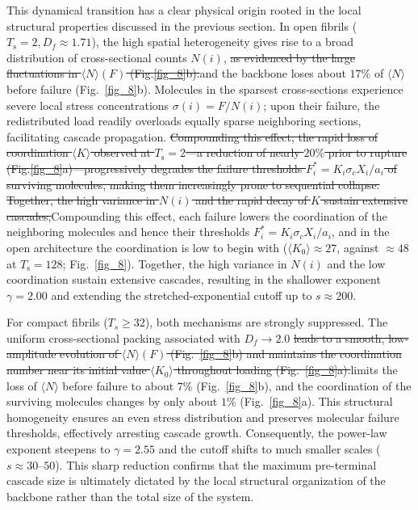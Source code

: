 \documentclass[aps,physrev,preprint,groupedaddress,linenumbers]{revtex4-2}
\newcommand{\added}[1]{{\color{red}#1}}
\newcommand{\deleted}[1]{{\color{red}\sout{#1}}}
\begin{document}
This dynamical transition has a clear physical origin rooted in the local structural properties discussed in the previous section. In open fibrils ($T_{\mathrm{s}} = 2, D_f \approx 1.71$), the high spatial heterogeneity gives rise to a broad distribution of cross-sectional counts $N(i)$, \deleted{as evidenced by the large fluctuations in $\langle N \rangle(F)$ (Fig.\ref{fig_8}b).}\added{and the backbone loses about $17\%$ of $\langle N \rangle$ before failure (Fig.~\ref{fig_8}b).} Molecules in the sparsest cross-sections experience severe local stress concentrations $\sigma(i) = F/N(i)$; upon their failure, the redistributed load readily overloads equally sparse neighboring sections, facilitating cascade propagation. \deleted{Compounding this effect, the rapid loss of coordination $\langle K \rangle$ observed at $T_{\mathrm{s}} = 2$—a reduction of nearly $20\%$ prior to rupture (Fig.\ref{fig_8}a)—progressively degrades the failure thresholds $F_i^* = K_i \sigma_c X_i / a_i$ of surviving molecules, making them increasingly prone to sequential collapse. Together, the high variance in $N(i)$ and the rapid decay of $K$ sustain extensive cascades,}\added{Compounding this effect, each failure lowers the coordination of the neighboring molecules and hence their thresholds $F_i^* = K_i \sigma_c X_i / a_i$, and in the open architecture the coordination is low to begin with ($\langle K_0 \rangle \approx 27$, against $\approx 48$ at $T_{\mathrm{s}} = 128$; Fig.~\ref{fig_8}). Together, the high variance in $N(i)$ and the low coordination sustain extensive cascades,} resulting in the shallower exponent $\gamma = 2.00$ and extending the stretched-exponential cutoff up to $s \approx 200$.

For compact fibrils ($T_{s}\ge 32$), both mechanisms are strongly suppressed. The uniform cross-sectional packing associated with $D_f \to 2.0$ \deleted{leads to a smooth, low-amplitude evolution of $\langle N \rangle(F)$ (Fig.~\ref{fig_8}b) and maintains the coordination number near its initial value $\langle K_0 \rangle$ throughout loading (Fig.~\ref{fig_8}a).}\added{limits the loss of $\langle N \rangle$ before failure to about $7\%$ (Fig.~\ref{fig_8}b), and the coordination of the surviving molecules changes by only about $1\%$ (Fig.~\ref{fig_8}a).} This structural homogeneity ensures an even stress distribution and preserves molecular failure thresholds, effectively arresting cascade growth. Consequently, the power-law exponent steepens to $\gamma = 2.55$ and the cutoff shifts to much smaller scales ($s \approx 30\text{--}50$). This sharp reduction confirms that the maximum pre-terminal cascade size is ultimately dictated by the local structural organization of the backbone rather than the total size of the system.
\end{document}
